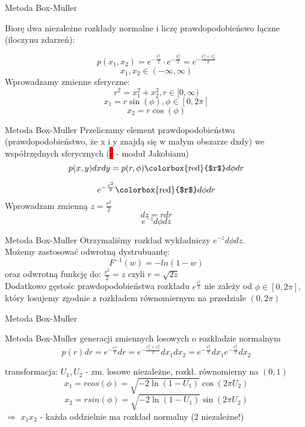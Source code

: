 \begin{frame}{Metoda Box-Muller}

		Biorę dwa niezależne rozkłady normalne i liczę prawdopodobieńswo 
		łączne (iloczynu zdarzeń):
		
		$$
			p(x_1,x_2) = e^{-\frac{x_1^{2}}{2}}\cdot e^{-\frac{x_2^{2}}{2}}=
			e^{-\frac{x_1^{2}+x_2^{2}}{2}}
		$$	
	    $$
		x_1, x_2 \in (-\infty,\infty)
		$$
		Wprowadzamy zmienne sferyczne:
		$$
		r^2=x_1^{2}+x_2^{2}, r \in[0,\infty)
		$$
		$$
		x_1=r\sin(\phi), \phi \in [0, 2\pi]
		$$
		$$
		x_2=r\cos(\phi)
		$$
\end{frame}
\begin{frame}{Metoda Box-Muller}
    Przeliczamy element prawdopodobieństwa (prawdopodobieństwo, że x i y  znajdą się w małym obszarze dxdy) we współrzędnych sferycznych (\colorbox{red}{$r$} - moduł Jakobianu)
$$
p(x,y)dxdy=p(r,\phi)
\textrm{\colorbox{red}{$r$}}
d\phi dr
$$

$$
e^{-\frac{r^2}{2}} \textrm{\colorbox{red}{$r$}} d\phi dr
$$
Wprowadzam zmienną $z=\frac{r^2}{2}$
$$
dz=rdr
$$
$$
e^{-z}  d\phi dz
$$
\end{frame}
\begin{frame}{Metoda Box-Muller }
    Otrzymaliśmy rozkład wykładniczy $e^{-z}  d\phi dz$.\\
    Możemy zastosować odwrotną dystrubuantę:
    $$
F^{-1}(w)=-ln(1-w)
$$
oraz odwrotną funkcję do:
$\frac{r^2}{2}=z$ czyli $r=\sqrt{2z} $\\
    Dodatkowo gęstośc prawdopodobieństwa rozkładu $ e^{\frac{r^2}{2}}$  nie zależy od $\phi \in [0,2\pi]$, który losujemy zgodnie z rozkładem równomiernym na przedziale $(0,2\pi)$
\end{frame}
\begin{frame}{Metoda Box-Muller}
	\begin{block}{Metoda Box-Muller  generacji zmiennych losowych o rozkładzie normalnym}
		\[
			p(r)dr = e^{-\frac{r^{2}}{2}}dr= e^{-\frac{x_1^{2}+x_2^2}{2}}dx_1dx_2=
			e^{-\frac{x_1^{2}}{2}}dx_1 e^{-\frac{x_2^{2}}{2}}dx_2
		\]
	\end{block}

	\begin{block}{transformacja:}
		$U_{1}, U_{2}$ - zm. losowe niezależne, rozkł. równomierny na $(0, 1)$
		\[
			x_{1} = r cos(\phi)=\sqrt{-2 \ln(1-U_1)} \cos(2\pi U_2)
		\]
		\[
			x_{2} = r sin(\phi)= \sqrt{-2 \ln(1-U_1)} \sin(2\pi U_2)
		\]
			$\Rightarrow$ $x_{1} x_{2}$ - każda oddzielnie ma rozkład normalny (2 niezależne!)
	\end{block}
\end{frame}
	
